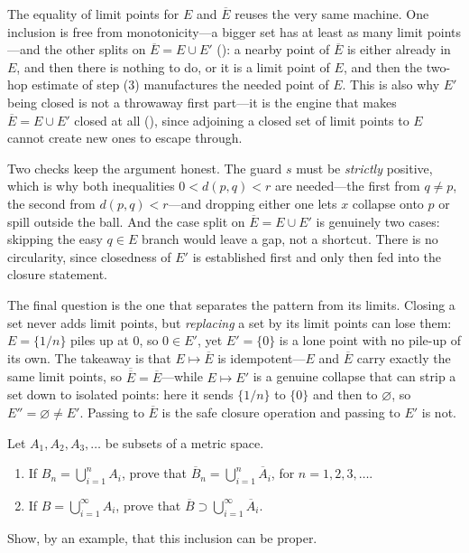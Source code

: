 \documentclass[main.tex]{subfiles}
\begin{document}
\begin{Reflection}
The equality of limit points for $E$ and $\overline E$ reuses the very same machine. One inclusion is
free from monotonicity---a bigger set has at least as many limit points---and the other splits on
$\overline E=E\cup E'$ (): a nearby point of $\overline E$ is either already in $E$, and
then there is nothing to do, or it is a limit point of $E$, and then the two-hop estimate of step (3)
manufactures the needed point of $E$. This is also why $E'$ being closed is not a throwaway first
part---it is the engine that makes $\overline E=E\cup E'$ closed at all
(), since adjoining a closed set of limit points to $E$
cannot create new ones to escape through.

Two checks keep the argument honest. The guard $s$ must be \emph{strictly} positive, which is why both
inequalities $0<d(p,q)<r$ are needed---the first from $q\neq p$, the second from $d(p,q)<r$---and
dropping either one lets $x$ collapse onto $p$ or spill outside the ball. And the case split on
$\overline E=E\cup E'$ is genuinely two cases: skipping the easy $q\in E$ branch would leave a gap, not
a shortcut. There is no circularity, since closedness of $E'$ is established first and only then fed
into the closure statement.

The final question is the one that separates the pattern from its limits. Closing a set never adds
limit points, but \emph{replacing} a set by its limit points can lose them: $E=\{1/n\}$ piles up at
$0$, so $0\in E'$, yet $E'=\{0\}$ is a lone point with no pile-up of its own. The takeaway is that
$E\mapsto\overline E$ is idempotent---$E$ and $\overline E$ carry exactly the same limit points, so
$\overline{\overline E}=\overline E$---while $E\mapsto E'$ is a genuine collapse that can strip a set
down to isolated points: here it sends $\{1/n\}$ to $\{0\}$ and then to $\varnothing$, so $E''=\varnothing
\neq E'$. Passing to $\overline E$ is the safe closure operation and passing to $E'$ is not.
\end{Reflection}

Let $A_{1}, A_{2}, A_{3}, \ldots$ be subsets of a metric space.
\begin{enumerate}[leftmargin=1.7em,itemsep=2pt,topsep=2pt,label=\textnormal{(\alph*)}]
  \item If $B_{n} = \bigcup_{i=1}^{n} A_{i}$, prove that $\overline{B}_{n} = \bigcup_{i=1}^{n} \overline{A}_{i}$, for $n = 1, 2, 3, \ldots$.
  \item If $B = \bigcup_{i=1}^{\infty} A_{i}$, prove that $\overline{B} \supset \bigcup_{i=1}^{\infty} \overline{A}_{i}$.
\end{enumerate}
Show, by an example, that this inclusion can be proper.
\end{document}
